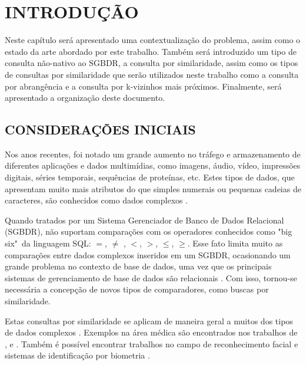
\chapter{INTRODUÇÃO}
\label{chap:introducao}

Neste capítulo será apresentado uma contextualização do problema, assim como o estado da arte abordado por este trabalho.
Também será introduzido um tipo de consulta não-nativo ao SGBDR, a consulta por similaridade, assim como os tipos de consultas por similaridade
que serão utilizados neste trabalho como a consulta por abrangência e a consulta por k-vizinhos mais próximos. Finalmente, será apresentado a
organização deste documento.

\section{CONSIDERAÇÕES INICIAIS}
\label{sec:considini}

Nos anos recentes, foi notado um grande aumento no tráfego e armazenamento de diferentes aplicações e dados multimídias, como imagens, áudio, vídeo, impressões digitais, séries temporais,
sequências de proteínas, etc. Estes tipos de dados, que apresentam muito mais atributos do que simples numerais ou pequenas cadeias de caracteres, são conhecidos como dados complexos \cite{Zighed2008}.\par
Quando tratados por um Sistema Gerenciador de Banco de Dados Relacional (SGBDR), não suportam comparações com os operadores conhecidos como "big six"\ da linguagem SQL: $=$, $\neq$ , $<$, $>$, $\leq$, $\geq$.
Esse fato limita muito as comparações entre dados complexos inseridos em um SGBDR, ocasionando um grande problema no contexto de base de dados, uma vez que os principais sistemas de gerenciamento
de base de dados são relacionais \cite{DBE2017}. Com isso, tornou-se necessária a concepção de novos tipos de comparadores, como buscas por similaridade.\par 

Estas consultas por similaridade se aplicam de maneira geral a muitos dos tipos de dados complexos \cite{Barioni2009}. Exemplos na área médica são encontrados nos trabalhos de 
\cite{Marchiori2001}, \cite{Bugatti2014} e \cite{Lehmann1999}. Também é possível encontrar trabalhos no campo de reconhecimento facial \cite{Gutta1997} e sistemas de identificação por biometria \cite{Choras2007}.

